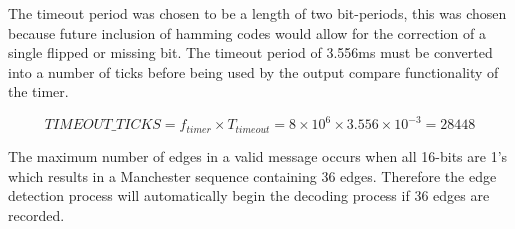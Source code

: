 The timeout period was chosen to be a length of two bit-periods, this was chosen because future inclusion of hamming codes would allow for the correction of a single flipped or missing bit. The timeout period of 3.556ms must be converted into a number of ticks before being used by the output compare functionality of the timer.

\[TIMEOUT\_TICKS = f_{timer} \times T_{timeout} = 8 \times 10^6 \times 3.556 \times 10^{-3} = 28448\]

The maximum number of edges in a valid message occurs when all 16-bits are 1's which results in a Manchester sequence containing 36 edges. Therefore the edge detection process will automatically begin the decoding process if 36 edges are recorded.









